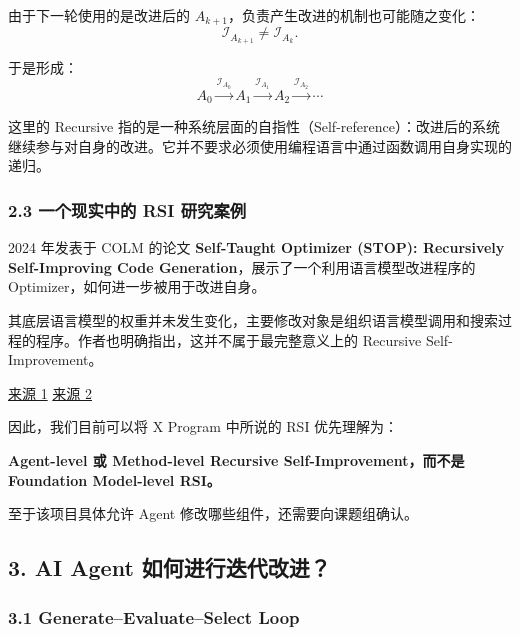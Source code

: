 由于下一轮使用的是改进后的 \(A_{k+1}\)，负责产生改进的机制也可能随之变化：
\[\mathcal I_{A_{k+1}}
\neq
\mathcal I_{A_k}.\]

于是形成：
\[A_0
\xrightarrow{\mathcal I_{A_0}}
A_1
\xrightarrow{\mathcal I_{A_1}}
A_2
\xrightarrow{\mathcal I_{A_2}}
\cdots\]

这里的 Recursive 指的是一种系统层面的自指性（Self-reference）：改进后的系统继续参与对自身的改进。它并不要求必须使用编程语言中通过函数调用自身实现的递归。

\hypertarget{part-1-07-0001-ux4e00ux4e2aux73b0ux5b9eux4e2dux7684-rsi-ux7814ux7a76ux6848ux4f8b}{%
\subsubsection{2.3 一个现实中的 RSI 研究案例}\label{part-1-07-0001-ux4e00ux4e2aux73b0ux5b9eux4e2dux7684-rsi-ux7814ux7a76ux6848ux4f8b}}

2024 年发表于 COLM 的论文 \textbf{Self-Taught Optimizer (STOP): Recursively Self-Improving Code Generation}，展示了一个利用语言模型改进程序的 Optimizer，如何进一步被用于改进自身。

其底层语言模型的权重并未发生变化，主要修改对象是组织语言模型调用和搜索过程的程序。作者也明确指出，这并不属于最完整意义上的 Recursive Self-Improvement。

\href{https://proceedings.colm.cc/paper_files/paper/2024/hash/52eb24c316c78cc144dfa54f1f4bb4ec-Abstract-Conference.html}{来源 1} \href{https://proceedings.colm.cc/paper_files/paper/2024/hash/52eb24c316c78cc144dfa54f1f4bb4ec-Abstract-Conference.html}{来源 2}

因此，我们目前可以将 X Program 中所说的 RSI 优先理解为：

\textbf{Agent-level 或 Method-level Recursive Self-Improvement，而不是 Foundation Model-level RSI。}

至于该项目具体允许 Agent 修改哪些组件，还需要向课题组确认。

\hypertarget{part-1-07-0001-ai-agent-ux5982ux4f55ux8fdbux884cux8fedux4ee3ux6539ux8fdb}{%
\subsection{3. AI Agent 如何进行迭代改进？}\label{part-1-07-0001-ai-agent-ux5982ux4f55ux8fdbux884cux8fedux4ee3ux6539ux8fdb}}

\hypertarget{part-1-07-0001-generateevaluateselect-loop}{%
\subsubsection{3.1 Generate--Evaluate--Select Loop}\label{part-1-07-0001-generateevaluateselect-loop}}

